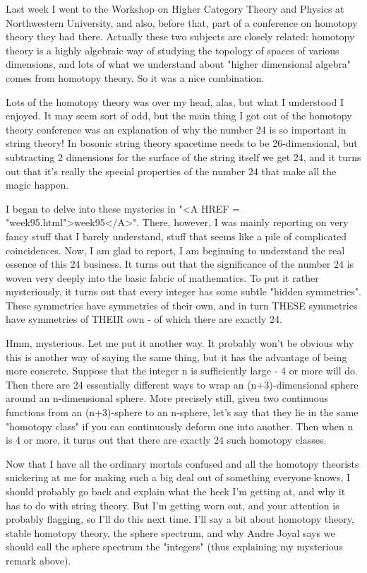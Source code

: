 Last week I went to the Workshop on Higher Category Theory and Physics
at Northwestern University, and also, before that, part of a conference 
on homotopy theory they had there.   Actually these two subjects are 
closely related: homotopy theory is a highly algebraic way of studying
the topology of spaces of various dimensions, and lots of what we understand
about "higher dimensional algebra" comes from homotopy theory.  So it was
a nice combination.

Lots of the homotopy theory was over my head, alas, but what I
understood I enjoyed.  It may seem sort of odd, but the main thing I got
out of the homotopy theory conference was an explanation of why the
number 24 is so important in string theory!  In bosonic string theory
spacetime needs to be 26-dimensional, but subtracting 2 dimensions for
the surface of the string itself we get 24, and it turns out that it's
really the special properties of the number 24 that make all the magic
happen.

I began to delve into these mysteries in "<A HREF = "week95.html">week95</A>".  There, however, I
was mainly reporting on very fancy stuff that I barely understand, stuff
that seems like a pile of complicated coincidences.  Now, I am glad to
report, I am beginning to understand the real essence of this 24
business.  It turns out that the significance of the number 24 is woven
very deeply into the basic fabric of mathematics.  To put it rather
mysteriously, it turns out that every integer has some subtle "hidden
symmetries".  These symmetries have symmetries of their own, and in turn
THESE symmetries have symmetries of THEIR own - of which there are
exactly 24.

Hmm, mysterious.  Let me put it another way.  It probably won't be
obvious why this is another way of saying the same thing, but it has the
advantage of being more concrete.  Suppose that the integer n is
sufficiently large - 4 or more will do.  Then there are 24 essentially
different ways to wrap an (n+3)-dimensional sphere around an
n-dimensional sphere.  More precisely still, given two continuous
functions from an (n+3)-sphere to an n-sphere, let's say that they lie
in the same "homotopy class" if you can continuously deform one into
another.  Then when n is 4 or more, it turns out that there are exactly
24 such homotopy classes.

Now that I have all the ordinary mortals confused and all the homotopy
theorists snickering at me for making such a big deal out of something
everyone knows, I should probably go back and explain what the heck I'm
getting at, and why it has to do with string theory.  But I'm getting
worn out, and your attention is probably flagging, so I'll do this next
time.  I'll say a bit about homotopy theory, stable homotopy theory, the
sphere spectrum, and why Andre Joyal says we should call the sphere
spectrum the "integers" (thus explaining my mysterious remark above).








